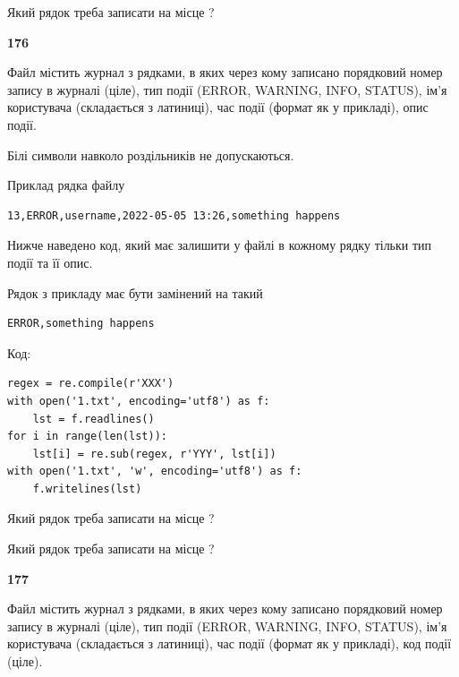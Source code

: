 Який рядок треба записати на місце  ?\par


\newpage

{\begin {center}\textbf{ 176}\end {center}}\par
Файл  містить журнал з рядками, в яких через кому записано поряд\-ко\-вий номер запису в журналі (ціле), тип події (ERROR, WARNING, INFO, STATUS), ім'я користувача (складається з латиниці), час події (фор\-мат як у прикладі), опис події.

Білі символи навколо роздільників не допускаються.

Приклад рядка файлу



\begin{verbatim}
13,ERROR,username,2022-05-05 13:26,something happens
\end{verbatim}


Нижче наведено код, який має залишити у файлі в кожному рядку тільки тип події та її опис.

Рядок з прикладу має бути замінений на такий



\begin{verbatim}
ERROR,something happens
\end{verbatim}




Код:



\begin{verbatim}
regex = re.compile(r'XXX')
with open('1.txt', encoding='utf8') as f:
    lst = f.readlines()
for i in range(len(lst)):
    lst[i] = re.sub(regex, r'YYY', lst[i])
with open('1.txt', 'w', encoding='utf8') as f:
    f.writelines(lst)
\end{verbatim}









Який рядок треба записати на місце  ?\par
\vspace{5mm}


Який рядок треба записати на місце  ?\par


\newpage

{\begin {center}\textbf{ 177}\end {center}}\par
Файл  містить журнал з рядками, в яких через кому записано поряд\-ко\-вий номер запису в журналі (ціле), тип події (ERROR, WARNING, INFO, STATUS), ім'я користувача (складається з латиниці), час події (фор\-мат як у прикладі), код події (ціле).

